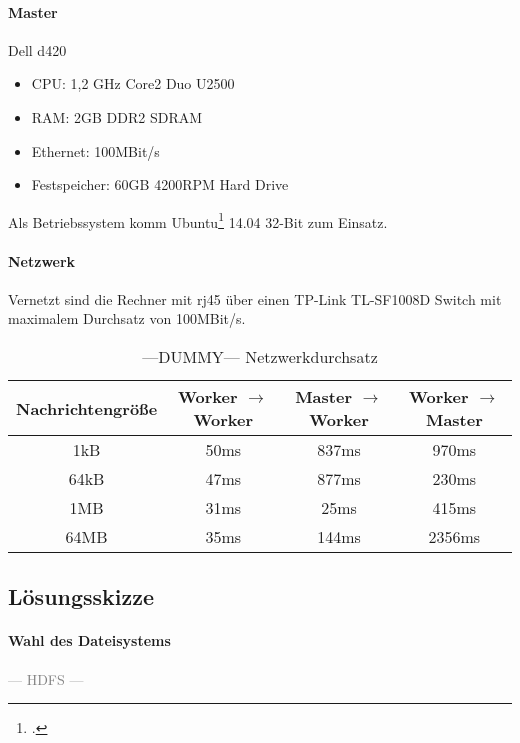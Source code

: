 \paragraph{Master}
Dell d420
\begin{itemize}
	\item CPU: 1,2 GHz Core2 Duo U2500
	\item RAM: 2GB DDR2 SDRAM
	\item Ethernet: 100MBit/s
	\item Festspeicher: 60GB 4200RPM Hard Drive
\end{itemize}
Als Betriebssystem komm Ubuntu\footcite{ubuntu} 14.04 32-Bit zum Einsatz.

\paragraph{Netzwerk}
Vernetzt sind die Rechner mit \gls{rj45} über einen TP-Link TL-SF1008D Switch mit maximalem Durchsatz von 100MBit/s.

\begin{table}[ht]
\caption{---DUMMY--- Netzwerkdurchsatz} %
\centering %
\begin{tabular}{c c c c} %
\hline\hline %
Nachrichtengröße & Worker $\rightarrow$ Worker & Master $\rightarrow$ Worker & Worker $\rightarrow$ Master \\ [0.5ex] %
\hline %
1kB & 50ms & 837ms & 970ms \\ %
64kB & 47ms & 877ms & 230ms \\
1MB & 31ms & 25ms & 415ms \\
64MB & 35ms & 144ms & 2356ms \\ [1ex] 
\hline %
\end{tabular}
\label{table:nonlin} %
\end{table}

\subsection{Lösungsskizze}


\paragraph{Wahl des Dateisystems}

\textcolor{gray}{--- HDFS ---}\\

